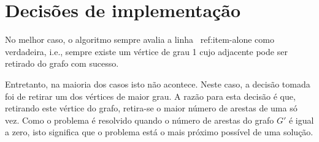 \section{Decisões de implementação}
\label{sec:decisoes}

No melhor caso, o algoritmo sempre avalia a linha ~{ref:item-alone} como verdadeira, i.e., sempre existe um vértice de grau 1 cujo adjacente pode ser retirado do grafo com sucesso.

Entretanto, na maioria dos casos isto não acontece. Neste caso, a decisão tomada foi de retirar um dos vértices de maior grau. A razão para esta decisão é que, retirando este vértice do grafo, retira-se o maior número de arestas de uma só vez. Como o problema é resolvido quando o número de arestas do grafo $G'$ é igual a zero, isto significa que o problema está o mais próximo possível de uma solução.